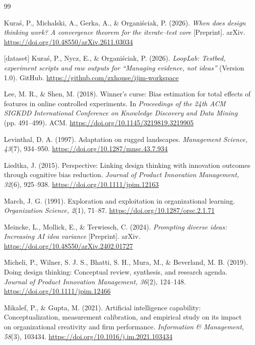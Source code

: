 \documentclass[preprint,12pt,authoryear]{elsarticle}
\newif\ifanon
\providecommand{\doi}[1]{\url{https://doi.org/#1}}
\theoremstyle{definition}
\begin{document}
\begin{thebibliography}{99}
\ifanon\else
{} Kura{\'s}, P., Michalski, A., Gerka, A., \& Organi{\'s}ciak, P. (2026). \textit{When does design thinking work? A convergence theorem for the iterate--test core} [Preprint]. arXiv. \doi{10.48550/arXiv.2611.03034}
\fi

\ifanon\else
{} [dataset] Kura{\'s}, P., Nycz, E., \& Organi{\'s}ciak, P. (2026). \textit{LoopLab: Testbed, experiment scripts and raw outputs for ``Managing evidence, not ideas''} (Version 1.0). GitHub. \url{https://github.com/zxhouse/ijim-workspace}
\fi

 Lee, M. R., \& Shen, M. (2018). Winner's curse: Bias estimation for total effects of features in online controlled experiments. In \textit{Proceedings of the 24th ACM SIGKDD International Conference on Knowledge Discovery and Data Mining} (pp. 491--499). ACM. \doi{10.1145/3219819.3219905}

 Levinthal, D. A. (1997). Adaptation on rugged landscapes. \textit{Management Science, 43}(7), 934--950. \doi{10.1287/mnsc.43.7.934}

 Liedtka, J. (2015). Perspective: Linking design thinking with innovation outcomes through cognitive bias reduction. \textit{Journal of Product Innovation Management, 32}(6), 925--938. \doi{10.1111/jpim.12163}

 March, J. G. (1991). Exploration and exploitation in organizational learning. \textit{Organization Science, 2}(1), 71--87. \doi{10.1287/orsc.2.1.71}

 Meincke, L., Mollick, E., \& Terwiesch, C. (2024). \textit{Prompting diverse ideas: Increasing AI idea variance} [Preprint]. arXiv. \doi{10.48550/arXiv.2402.01727}

 Micheli, P., Wilner, S. J. S., Bhatti, S. H., Mura, M., \& Beverland, M. B. (2019). Doing design thinking: Conceptual review, synthesis, and research agenda. \textit{Journal of Product Innovation Management, 36}(2), 124--148. \doi{10.1111/jpim.12466}

 Mikalef, P., \& Gupta, M. (2021). Artificial intelligence capability: Conceptualization, measurement calibration, and empirical study on its impact on organizational creativity and firm performance. \textit{Information \& Management, 58}(3), 103434. \doi{10.1016/j.im.2021.103434}


\end{thebibliography}
\end{document}
